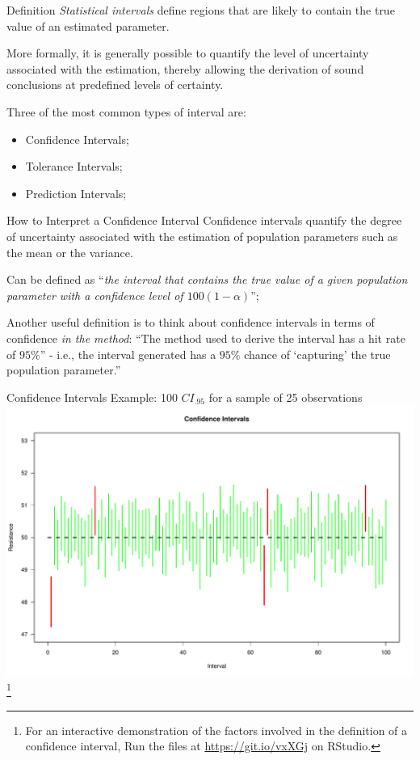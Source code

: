 
\begin{frame}{Definition}
\textit{Statistical intervals} define regions that are likely to contain the true value of an estimated parameter.
\bigskip

More formally, it is generally possible to quantify the level of uncertainty associated with the estimation, thereby allowing the derivation of sound conclusions at predefined levels of certainty.
\bigskip

Three of the most common types of interval are:

\begin{itemize}
  \item Confidence Intervals;
  \item Tolerance Intervals;
  \item Prediction Intervals;
\end{itemize}
\end{frame}



\begin{frame}{How to Interpret a Confidence Interval}
Confidence intervals quantify the degree of uncertainty associated with the estimation of population parameters such as the mean or the variance.\bigskip

Can be defined as ``\textit{the interval that contains the true value of a given population parameter with a confidence level of $100(1-\alpha)$}'';\bigskip

Another useful definition is to think about confidence intervals in terms of confidence \textit{in the method}: ``The method used to derive the interval has a hit rate of $95\%$'' - i.e., the interval generated has a $95\%$ chance of `capturing' the true population parameter.''
\end{frame}


\begin{frame}
{Confidence Intervals}
{Example: 100 $CI_{.95}$ for a sample of 25 observations}
\centering\includegraphics[width=.8\textwidth]{../img/CIs.pdf}
\footnote{For an interactive demonstration of the factors involved in the definition of a confidence interval, Run the files at \url{https://git.io/vxXGj} on RStudio.}
\end{frame}

